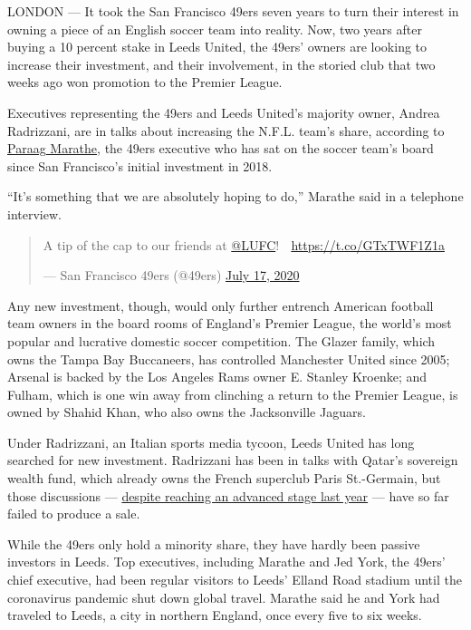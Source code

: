 LONDON --- It took the San Francisco 49ers seven years to turn their
interest in owning a piece of an English soccer team into reality. Now,
two years after buying a 10 percent stake in Leeds United, the 49ers'
owners are looking to increase their investment, and their involvement,
in the storied club that two weeks ago won promotion to the Premier
League.

Executives representing the 49ers and Leeds United's majority owner,
Andrea Radrizzani, are in talks about increasing the N.F.L. team's
share, according to
\href{https://www.49ers.com/team/front-office-roster/paraag-marathe}{Paraag
Marathe}, the 49ers executive who has sat on the soccer team's board
since San Francisco's initial investment in 2018.

``It's something that we are absolutely hoping to do,'' Marathe said in
a telephone interview.

\begin{quote}
A tip of the cap to our friends at
\href{https://twitter.com/LUFC?ref_src=twsrc\%5Etfw}{@LUFC}! 👏
\url{https://t.co/GTxTWF1Z1a}

--- San Francisco 49ers (@49ers)
\href{https://twitter.com/49ers/status/1284236719890460673?ref_src=twsrc\%5Etfw}{July
17, 2020}
\end{quote}

Any new investment, though, would only further entrench American
football team owners in the board rooms of England's Premier League, the
world's most popular and lucrative domestic soccer competition. The
Glazer family, which owns the Tampa Bay Buccaneers, has controlled
Manchester United since 2005; Arsenal is backed by the Los Angeles Rams
owner E. Stanley Kroenke; and Fulham, which is one win away from
clinching a return to the Premier League, is owned by Shahid Khan, who
also owns the Jacksonville Jaguars.

Under Radrizzani, an Italian sports media tycoon, Leeds United has long
searched for new investment. Radrizzani has been in talks with Qatar's
sovereign wealth fund, which already owns the French superclub Paris
St.-Germain, but those discussions ---
\href{https://www.nytimes.com/2019/06/03/sports/qatar-may-buy-into-english-team-leeds.html}{despite
reaching an advanced stage last year} --- have so far failed to produce
a sale.

While the 49ers only hold a minority share, they have hardly been
passive investors in Leeds. Top executives, including Marathe and Jed
York, the 49ers' chief executive, had been regular visitors to Leeds'
Elland Road stadium until the coronavirus pandemic shut down global
travel. Marathe said he and York had traveled to Leeds, a city in
northern England, once every five to six weeks.

